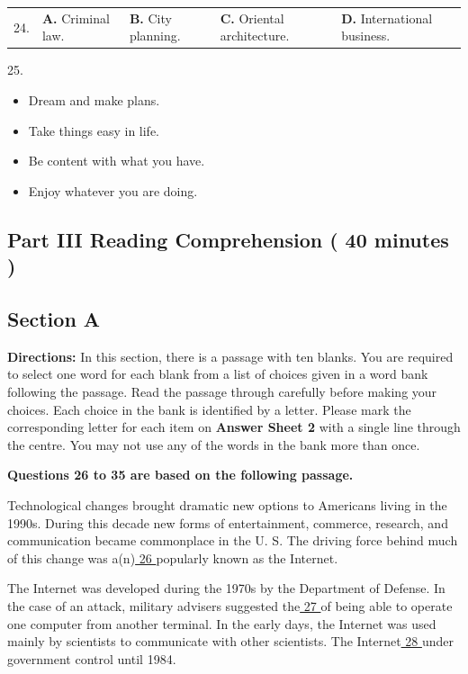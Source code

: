 \documentclass[UTF8,11pt]{ctexart}
\begin{document}
\noindent\begin{tabularx}{\linewidth}{@{}lXXXX@{}}24. & \textbf{A.} Criminal law. & \textbf{B.} City planning. & \textbf{C.} Oriental architecture. & \textbf{D.} International business.\\\end{tabularx}\par

25.


\begin{itemize}[leftmargin=2em,itemsep=.2em,topsep=.4em]\item[A.] Dream and make plans.
\item[B.] Take things easy in life.
\item[C.] Be content with what you have.
\item[D.] Enjoy whatever you are doing.
\end{itemize}

\subsection*{\textbf{Part} III \textbf{Reading Comprehension} \textbf{( 40 minutes )}}


\subsection*{\textbf{Section A}}


\textbf{Directions:} In this section, there is a passage with ten blanks. You are required to select one word for each blank from a list of choices given in a word bank following the passage. Read the passage through carefully before making your choices. Each choice in the bank is identified by a letter. Please mark the corresponding letter for each item on\textbf{ Answer Sheet 2} with a single line through the centre. You may not use any of the words in the bank more than once.


\textbf{Questions 26 to 35 are based on the following passage.}


Technological changes brought dramatic new options to Americans living in the 1990s. During this decade new forms of entertainment, commerce, research, and communication became commonplace in the U. S. The driving force behind much of this change was a(n)\uline{ 26 }popularly known as the Internet.


The Internet was developed during the 1970s by the Department of Defense. In the case of an attack, military advisers suggested the\uline{ 27 }of being able to operate one computer from another terminal. In the early days, the Internet was used mainly by scientists to communicate with other scientists. The Internet\uline{ 28 }under government control until 1984.
\end{document}
